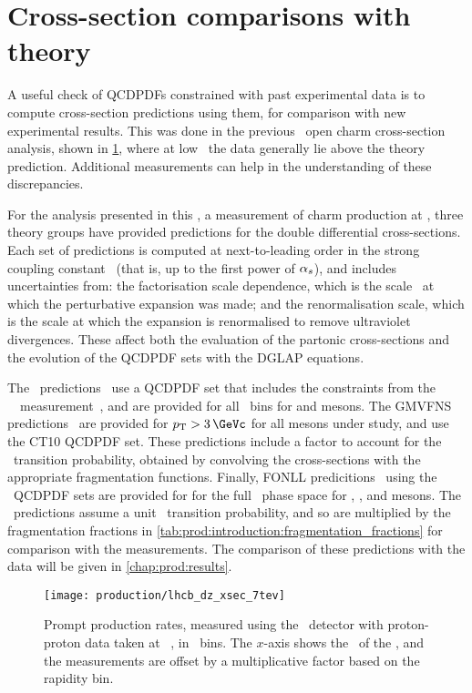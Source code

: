 \section{Cross-section comparisons with theory}
\label{chap:prod:theory:comparisons}

A useful check of \acp{QCDPDF} constrained with past experimental data is to 
compute cross-section predictions using them, for comparison with new 
experimental results.
This was done in the previous \lhcb\ open charm cross-section analysis, shown 
in \cref{fig:prod:theory:comparisons:7tev}, where at low \pT\ the data 
generally lie above the theory prediction.
Additional measurements can help in the understanding of these discrepancies.

For the analysis presented in this , a measurement of charm 
production at , three theory groups have provided predictions for 
the double differential cross-sections.
Each set of predictions is computed at next-to-leading order in the strong 
coupling constant \alphas\ (that is, up to the first power of $\alpha_{s}$), and 
includes uncertainties from: the factorisation scale dependence, which is the 
scale \pdfqsquared\ at which the perturbative expansion was made; and the 
renormalisation scale, which is the scale at which the expansion is 
renormalised to remove ultraviolet divergences.
These affect both the evaluation of the partonic cross-sections and the 
evolution of the \ac{QCDPDF} sets with the \ac{DGLAP} equations.

The \nnpdfl\ predictions~\cite{Gauld:2015yia} use a \ac{QCDPDF} set that 
includes the constraints from the \ \lhcb\ 
measurement~\cite{LHCb-PAPER-2012-041}, and are provided for all \pTy\ bins for 
\PDz and \PDp mesons.
The \ac{GMVFNS} predictions~\cite{Kniehl:2012ti} are provided for $\pT > 
\SI{3}{\GeVc}$ for all mesons under study, and use the CT10 \ac{QCDPDF} set.
These predictions include a factor to account for the \cToHc\ transition 
probability, obtained by convolving the \decay{\ccbar}{\PHc} cross-sections 
with the appropriate fragmentation functions.
Finally, \ac{FONLL} predicitions~\cite{Cacciari:2015fta} using the \nnpdf\ 
\ac{QCDPDF} sets are provided for for the full \pTy\ phase space for \PDz, 
\PDp, and \PDstarp mesons.
The \fonll\ predictions assume a unit \cToHc\ transition probability, and so 
are multiplied by the fragmentation fractions in 
\cref{tab:prod:introduction:fragmentation_fractions} for comparison with the 
measurements.
The comparison of these predictions with the data will be given in 
\cref{chap:prod:results}.

\begin{figure}
  \centering
  \texttt{[image: production/lhcb\_dz\_xsec\_7tev]}
  \caption{%
    Prompt \PDzero production rates, measured using the \lhcb\ detector with 
    proton-proton data taken at ~\cite{LHCb-PAPER-2012-041}, in 
    \pTy\ bins.
    The $x$-axis shows the \pT\ of the \PDzero, and the measurements are offset 
    by a multiplicative factor based on the rapidity bin.
  }
  \label{fig:prod:theory:comparisons:7tev}
\end{figure}
